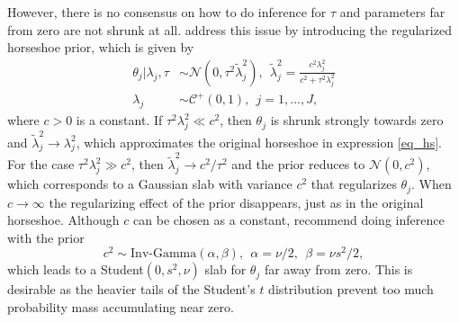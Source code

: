 However, there is no consensus on how to do inference for $\tau$ and parameters far from zero are not shrunk at all.
\cite{piironen_sparsity_2017} address this issue by introducing the regularized horseshoe prior, which is given by
\begin{equation}
    \begin{split}
        \theta_j | \lambda_j, \tau & \sim \mathcal N (0, \tau^2 \tilde \lambda^2_j),
        ~~ \tilde \lambda_j^2 = \displaystyle \frac{c^2 \lambda^2_j}{c^2 + \tau^2 \lambda_j^2}\\
        \lambda_j & \sim \mathcal C^+ (0, 1), ~~ j = 1,..., J,
    \end{split}
\end{equation}
where $c > 0$ is a constant.
If $\tau^2\lambda^2_j \ll c^2$, then $\theta_j$ is shrunk strongly towards zero and $\tilde \lambda^2_j \rightarrow \lambda^2_j$, which approximates the original horseshoe in expression \ref{eq_hs}.
For the case $\tau^2\lambda^2_j \gg c^2$, then $\tilde \lambda^2_j \rightarrow c^2/\tau^2$ and the prior reduces to $\mathcal N(0, c^2)$, which corresponds to a Gaussian slab with variance $c^2$ that regularizes $\theta_j$.
When $c \rightarrow \infty$ the regularizing effect of the prior disappears, just as in the original horseshoe.
Although $c$ can be chosen as a constant, \cite{piironen_sparsity_2017} recommend doing inference with the prior
\begin{equation*}
    c^2 \sim \text{Inv-Gamma}(\alpha, \beta), ~~ \alpha = \nu/2, ~~ \beta = \nu s^2/2,
\end{equation*}
which leads to a Student$(0, s^2, \nu)$ slab for $\theta_j$ far away from zero.
This is desirable as the heavier tails of the Student's $t$ distribution prevent too much probability mass accumulating near zero.

